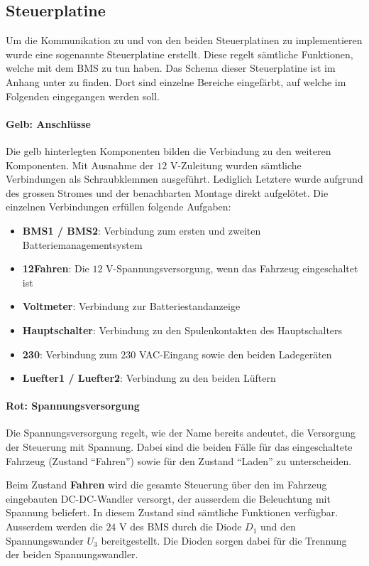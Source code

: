 \subsection{Steuerplatine}
Um die Kommunikation zu und von den beiden Steuerplatinen zu implementieren wurde eine sogenannte Steuerplatine erstellt. Diese regelt sämtliche Funktionen, welche mit dem BMS zu tun haben. Das Schema dieser Steuerplatine ist im Anhang unter  zu finden. Dort sind einzelne Bereiche eingefärbt, auf welche im Folgenden eingegangen werden soll.

\paragraph{Gelb: Anschlüsse}
Die gelb hinterlegten Komponenten bilden die Verbindung zu den weiteren Komponenten. Mit Ausnahme der $12$ V-Zuleitung wurden sämtliche Verbindungen als Schraubklemmen ausgeführt. Lediglich Letztere wurde aufgrund des grossen Stromes und der benachbarten Montage direkt aufgelötet. Die einzelnen Verbindungen erfüllen folgende Aufgaben: \begin{itemize}
	\item \textbf{BMS1 / BMS2}: Verbindung zum ersten und zweiten Batteriemanagementsystem
	\item \textbf{12Fahren}: Die $12$ V-Spannungsversorgung, wenn das Fahrzeug eingeschaltet ist
	\item \textbf{Voltmeter}: Verbindung zur Batteriestandanzeige
	\item \textbf{Hauptschalter}: Verbindung zu den Spulenkontakten des Hauptschalters
	\item \textbf{230}: Verbindung zum $230$ VAC-Eingang sowie den beiden Ladegeräten
	\item \textbf{Luefter1 / Luefter2}: Verbindung zu den beiden Lüftern
\end{itemize}

\paragraph{Rot: Spannungsversorgung}
Die Spannungsversorgung regelt, wie der Name bereits andeutet, die Versorgung der Steuerung mit Spannung. Dabei sind die beiden Fälle für das eingeschaltete Fahrzeug (Zustand "`Fahren"') sowie für den Zustand "`Laden"' zu unterscheiden.

Beim Zustand \textbf{Fahren} wird die gesamte Steuerung über den im Fahrzeug eingebauten DC-DC-Wandler versorgt, der ausserdem die Beleuchtung mit Spannung beliefert. In diesem Zustand sind sämtliche Funktionen verfügbar. Ausserdem werden die $24$ V des BMS durch die Diode $D_1$ und den Spannungswander $U_3$ bereitgestellt. Die Dioden sorgen dabei für die Trennung der beiden Spannungswandler.

